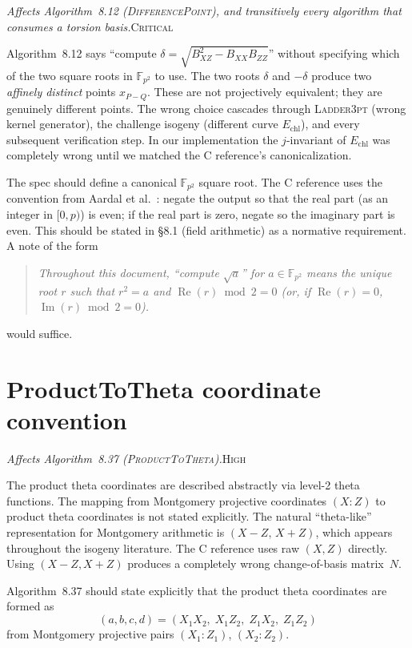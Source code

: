 \documentclass[a4paper,11pt]{article}
\newcommand{\algo}[1]{Algorithm~#1}
\newcommand{\Fpii}{\mathbb{F}_{p^2}}
\newcommand{\critical}{\textsc{\color{BrickRed}Critical}}
\newcommand{\high}{\textsc{\color{BurntOrange}High}}
\newcommand{\finding}[2]{\noindent\textit{#1}\hfill#2\par\smallskip}
\begin{document}
\finding{Affects \algo{8.12} (\textsc{DifferencePoint}), and
transitively every algorithm that consumes a torsion basis.}{\critical}

\algo{8.12} says ``compute $\delta = \sqrt{B_{XZ}^2 - B_{XX} B_{ZZ}}$''
without specifying which of the two square roots in $\Fpii$ to use.
The two roots $\delta$ and $-\delta$ produce two \emph{affinely distinct}
points $x_{P-Q}$.  These are not projectively equivalent; they are
genuinely different points.  The wrong choice cascades through
\textsc{Ladder3pt} (wrong kernel generator), the challenge isogeny
(different curve $E_{\text{chl}}$), and every subsequent verification
step.  In our implementation the $j$-invariant of $E_{\text{chl}}$ was
completely wrong until we matched the C reference's canonicalization.

The spec should define a canonical $\Fpii$ square root.  The C reference
uses the convention from Aardal et al.~\cite{ABCDK24}: negate the
output so that the real part (as an integer in $[0, p)$) is even; if the
real part is zero, negate so the imaginary part is even.  This should be
stated in \S8.1 (field arithmetic) as a normative requirement.  A note
of the form
\begin{quote}
  \itshape Throughout this document, ``compute $\sqrt{a}$'' for
  $a \in \Fpii$ means the unique root $r$ such that $r^2 = a$ and
  $\operatorname{Re}(r) \bmod 2 = 0$ (or, if $\operatorname{Re}(r)=0$,
  $\operatorname{Im}(r) \bmod 2 = 0$).
\end{quote}
would suffice.

\section{ProductToTheta coordinate convention}
\label{sec:product-to-theta}

\finding{Affects \algo{8.37} (\textsc{ProductToTheta}).}{\high}

The product theta coordinates are described abstractly via level-2 theta
functions.  The mapping from Montgomery projective coordinates $(X:Z)$ to
product theta coordinates is not stated explicitly.  The natural
``theta-like'' representation for Montgomery arithmetic is $(X-Z,\,X+Z)$,
which appears throughout the isogeny literature.  The C reference uses
raw $(X, Z)$ directly.  Using $(X-Z, X+Z)$ produces a completely wrong
change-of-basis matrix~$N$.

\algo{8.37} should state explicitly that the product theta coordinates
are formed as
\[
  (a, b, c, d) = (X_1 X_2,\; X_1 Z_2,\; Z_1 X_2,\; Z_1 Z_2)
\]
from Montgomery projective pairs $(X_1 : Z_1)$, $(X_2 : Z_2)$.
\end{document}

